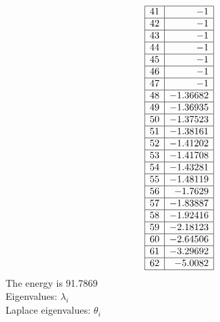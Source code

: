 \documentclass[12pt]{article}
\begin{document}
{$$\begin{array}{|r|r|}
\hline
41 & -1\\
\hline
42 & -1\\
\hline
43 & -1\\
\hline
44 & -1\\
\hline
45 & -1\\
\hline
46 & -1\\
\hline
47 & -1\\
\hline
48 & -1.36682\\
\hline
49 & -1.36935\\
\hline
50 & -1.37523\\
\hline
51 & -1.38161\\
\hline
52 & -1.41202\\
\hline
53 & -1.41708\\
\hline
54 & -1.43281\\
\hline
55 & -1.48119\\
\hline
56 & -1.7629\\
\hline
57 & -1.83887\\
\hline
58 & -1.92416\\
\hline
59 & -2.18123\\
\hline
60 & -2.64506\\
\hline
61 & -3.29692\\
\hline
62 & -5.0082\\
\hline
\end{array}
$$
The energy is 91.7869\\
Eigenvalues: $\lambda_i$\\
Laplace eigenvalues: $\theta_i$\\


%


%


}%
\end{document}
